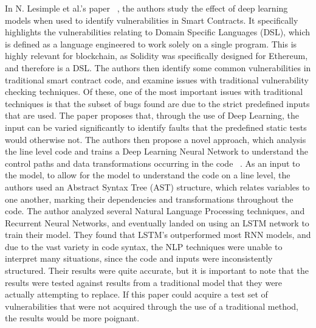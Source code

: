 In N. Lesimple et al.'s paper ~\cite{day2019ethereum}, the authors study the effect of deep learning models when used to identify vulnerabilities in Smart Contracts.
It specifically highlights the vulnerabilities relating to Domain Specific Languages (DSL), which is defined as a language engineered to work solely on a single program.
This is highly relevant for blockchain, as Solidity was specifically designed for Ethereum, and therefore is a DSL.
The authors then identify some common vulnerabilities in traditional smart contract code, and examine issues with traditional vulnerability checking techniques.
Of these, one of the most important issues with traditional techniques is that the subset of bugs found are due to the strict predefined inputs that are used.
The paper proposes that, through the use of Deep Learning, the input can be varied significantly to identify faults that the predefined static tests would otherwise not.
The authors then propose a novel approach, which analysis the line level code and trains a Deep Learning Neural Network to understand the
control paths and data transformations occurring in the code ~\cite{day2019ethereum}.
As an input to the model, to allow for the model to understand the code on a line level, the authors used an Abstract Syntax Tree (AST) structure,
which relates variables to one another, marking their
dependencies and transformations throughout the code.
The author analyzed several Natural Language Processing techniques, and Recurrent Neural Networks, and eventually landed on using an LSTM network to train their model.
They found that LSTM's outperformed most RNN models, and due to the vast variety in code syntax, the NLP techniques were unable to interpret many situations, since the code and inputs were inconsistently structured.
Their results were quite accurate, but it is important to note that the results were tested against results from a traditional model that they were actually attempting to replace.
If this paper could acquire a test set of vulnerabilities that were not acquired through the use of a traditional method, the results would be more poignant.

